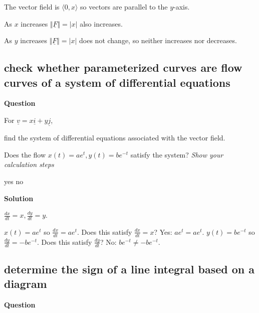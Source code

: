 \documentclass[12pt,letterpaper,noanswers]{exam}
\newcommand{\mb}[1]{\underline{#1}}
\begin{document}
\begin{questions}
\question 
\begin{parts}
\item The vector field is $\langle 0, x\rangle$ so vectors are parallel to the $y$-axis.
\item As $x$ increases $\Vert \mb F \Vert = \vert x \vert$ also increases.
\item As $y$ increases $\Vert \mb F \Vert = \vert x \vert$ does not change, so neither increases nor decreases.
\end{parts}
\end{questions}

\subsection{check whether parameterized curves are flow curves of a system of differential equations}
\noindent\textbf{Question}

\begin{questions}
\question For $\mb v = x\mb i + y\mb j$,
\begin{parts}
\item find the system of differential equations associated with the vector field.
\item Does the flow $x(t) = ae^t, y(t) = be^{-t}$ satisfy the system?  \emph{Show your calculation steps}

\begin{oneparcheckboxes}
\choice yes
\choice no
\end{oneparcheckboxes}
\end{parts}
\end{questions}


\noindent\textbf{Solution}

\begin{questions}
\question 
\begin{parts}
\item $\frac{dx}{dt} = x, \frac{dy}{dt} = y$.
\item $x(t) = ae^t$ so $\frac{dx}{dt} = ae^t$.  Does this satisfy $\frac{dx}{dt} = x$?  Yes: $ae^t=ae^t$.  $y(t) = be^{-t}$ so $\frac{dy}{dt} = -be^{-t}$.  Does this satisfy $\frac{dy}{dt}$?  No: $be^{-t} \neq -be^{-t}$.
\end{parts}
\end{questions}


\subsection{determine the sign of a line integral based on a diagram}
\noindent\textbf{Question}
\end{document}
